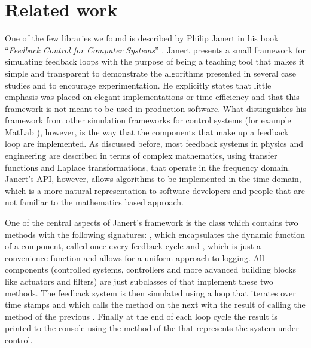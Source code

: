 \section{Related work}
One of the few libraries we found is described by Philip Janert in his book ``\textit{Feedback Control for Computer Systems}'' \cite{janert2013-feedback}. Janert presents a small framework for simulating feedback loops with the purpose of being a teaching tool that makes it simple and transparent to demonstrate the algorithms presented in several case studies and to encourage experimentation. He explicitly states that little emphasis was placed on elegant implementations or time efficiency and that this framework is not meant to be used in production software. What distinguishes his framework from other simulation frameworks for control systems (for example MatLab \cite{Matlab-Feedback}), however, is the way that the components that make up a feedback loop are implemented. As discussed before, most feedback systems in physics and engineering are described in terms of complex mathematics, using transfer functions and Laplace transformations, that operate in the frequency domain. Janert's API, however, allows algorithms to be implemented in the time domain, which is a more natural representation to software developers and people that are not familiar to the mathematics based approach.

One of the central aspects of Janert's framework is the  class which contains two methods with the following signatures: , which encapsulates the dynamic function of a component, called once every feedback cycle and , which is just a convenience function and allows for a uniform approach to logging. All components (controlled systems, controllers and more advanced building blocks like actuators and filters) are just subclasses of  that implement these two methods. The feedback system is then simulated using a loop that iterates over time stamps and which calls the  method on the next  with the result of calling the  method of the previous . Finally at the end of each loop cycle the result is printed to the console using the  method of the  that represents the system under control.

